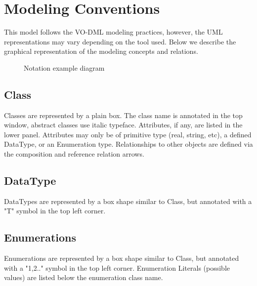 \pagebreak
\section{Modeling Conventions}
This model follows the VO-DML modeling practices, however, the UML representations may vary depending on the tool used.  Below we describe the graphical representation of the modeling concepts and relations.

  \begin{figure}[h]
  \begin{center}
    \caption{Notation example diagram}\label{fig:notation_example}
  \end{center}
  \end{figure}

  \subsection{Class}
  \label{sect:Class}
  Classes are represented by a plain box. The class name is annotated in the top window, abstract
classes use italic typeface. Attributes, if any, are listed in the lower panel. Attributes may only be
of primitive type (real, string, etc), a defined DataType, or an Enumeration type. Relationships to
other objects are defined via the composition and reference relation arrows.

  \subsection{DataType}
  \label{sect:DataType}
  DataTypes are represented by a box shape similar to Class, but annotated with a "T" symbol in the top left corner.

  \subsection{Enumerations}
  \label{sect:Enumerations}
  Enumerations are represented by a box shape similar to Class, but annotated with a "1,2.."
symbol in the top left corner. Enumeration Literals (possible values) are listed below the
enumeration class name.

